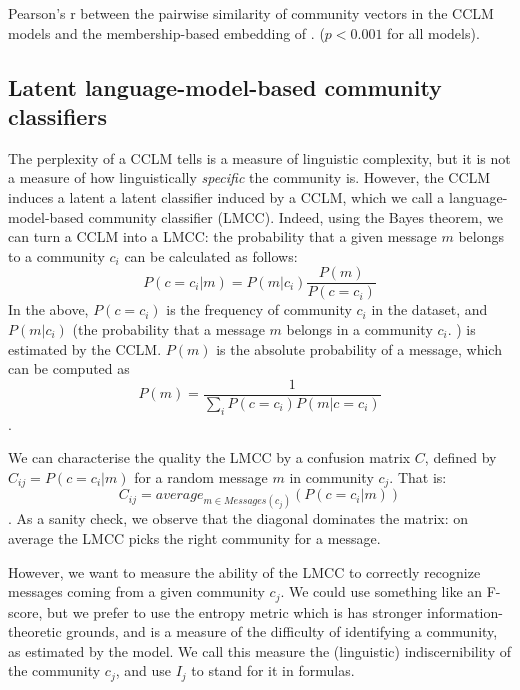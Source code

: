 \documentclass[11pt,a4paper]{article}
\newcommand\jp[1]{\todo[backgroundcolor=blue!10]{JP: #1}}
\newcommand\Ind{I}
\begin{document}
\begin{table}
  \centering
  
  \caption{Pearson's r between the pairwise similarity of community vectors
  in the CCLM models and the membership-based embedding of \citet{Kumar2018}.
  ($p<0.001$ for all models).
  }
  \label{tab:pairwise-comm-sim}
\end{table}

\subsection{Latent language-model-based community classifiers}

The perplexity of a CCLM tells is a measure of linguistic complexity,
but it is not a measure of how linguistically \emph{specific} the
community is. However, the CCLM induces a latent 
a latent classifier induced by a CCLM, which we call a language-model-based community classifier
(LMCC). Indeed, using the Bayes theorem, we can turn a
CCLM into a LMCC: the probability that a given message $m$
belongs to a community $c_i$ can be calculated as follows:
\[P(c=c_i | m) = P(m | c_i)\frac {P(m)} {P(c=c_i)}\]
In the above,
$P(c=c_i)$ is the frequency of community $c_i$ in the dataset, and
$P(m | c_i)$ (the probability that a message $m$
belongs in a community $c_i$. ) is estimated by the CCLM. $P(m)$ is the absolute
probability of a message, which can be computed as
\[P(m) = \frac 1 {\sum_i P(c=c_i) P(m|c=c_i ) }\].

We can characterise the quality the LMCC by a confusion matrix
$C$, defined by $C_{ij} = P(c=c_i | m)$ for a random message $m$ in
community $c_j$.  That is:
\[C_{ij} = average_{m \in Messages(c_j)}(P(c=c_i | m))\].
As a sanity check, we observe that the diagonal dominates the matrix: on average the LMCC picks the right community for a message.

\jp{Is this test set or training set?}




However, we want to measure the ability of the LMCC to correctly
recognize messages coming from a given community $c_j$. We could use
something like an F-score, but we prefer to use the entropy metric
which is has stronger information-theoretic grounds, and is a measure
of the difficulty of identifying a community, as estimated by the
model. We call this measure the (linguistic) indiscernibility of the
community $c_j$, and use \(\Ind_j\) to stand for it in formulas.
\end{document}
